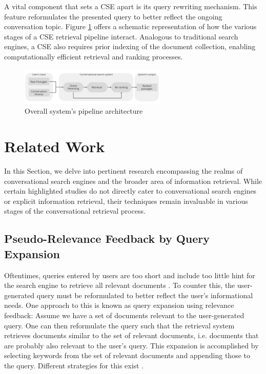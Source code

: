\documentclass[sigconf]{acmart}
\begin{document}
A vital component that sets a CSE apart is its query rewriting mechanism. This feature reformulates the presented query to better reflect the ongoing conversation topic. Figure \ref{figure:global_pipeline} offers a schematic representation of how the various stages of a CSE retrieval pipeline interact. Analogous to traditional search engines, a CSE also requires prior indexing of the document collection, enabling computationally efficient retrieval and ranking processes.

\begin{figure}[h]
	\includegraphics[width=7cm]{pipeline.png}
	\caption{Overall system's pipeline architecture}
	\label{figure:global_pipeline}
\end{figure}


\section{Related Work}\label{sec:related}
In this Section, we delve into pertinent research encompassing the realms of conversational search engines and the broader area of information retrieval. While certain highlighted studies do not directly cater to conversational search engines or explicit information retrieval, their techniques remain invaluable in various stages of the conversational retrieval process.

\subsection*{Pseudo-Relevance Feedback by Query Expansion}\label{sec:prf}
Oftentimes, queries entered by users are too short and include too little hint for the search engine to retrieve all relevant documents \cite{vaidyanathan2015query}. To counter this, the user-generated query must be reformulated to better reflect the user's informational needs. One approach to this is known as query expansion using relevance feedback: Assume we have a set of documents relevant to the user-generated query. One can then reformulate the query such that the retrieval system retrieves documents similar to the set of relevant documents, i.e. documents that are probably also relevant to the user's query. This expansion is accomplished by selecting keywords from the set of relevant documents and appending those to the query. Different strategies for this exist \cite{vaidyanathan2015query}.
\end{document}
